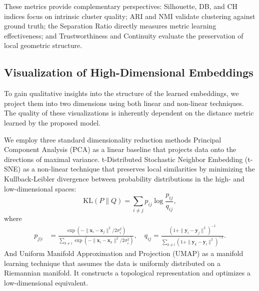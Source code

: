 \documentclass[a4paper,12pt,reqno]{amsart}
\theoremstyle{definition}
\theoremstyle{remark}
\begin{document}
These metrics provide complementary perspectives: Silhouette, DB, and CH indices focus on intrinsic cluster quality; ARI and NMI validate clustering against ground truth; the Separation Ratio directly measures metric learning effectiveness; and Trustworthiness and Continuity evaluate the preservation of local geometric structure.

\subsection{Visualization of High-Dimensional Embeddings}
To gain qualitative insights into the structure of the learned embeddings, we project them into two dimensions using both linear and non-linear techniques. The quality of these visualizations is inherently dependent on the distance metric learned by the proposed model.

We employ three standard dimensionality reduction methods Principal Component Analysis (PCA) \cite{doi:10.1080/14786440109462720} as a linear baseline that projects data onto the directions of maximal variance. t-Distributed Stochastic Neighbor Embedding (t-SNE) \cite{maaten2008visualizing} as a non-linear technique that preserves local similarities by minimizing the Kullback-Leibler divergence \cite{kullback1951information} between probability distributions in the high- and low-dimensional spaces:
\begin{equation}
 \text{KL}(P \| Q) = \sum_{i \neq j} p_{ij} \log \frac{p_{ij}}{q_{ij}},    
\end{equation}
where
        \begin{align}
         p_{j|i} &= \frac{\exp(-\|\mathbf{x}_i - \mathbf{x}_j\|^2 / 2\sigma_i^2)}{\sum_{k \neq i} \exp(-\|\mathbf{x}_i - \mathbf{x}_k\|^2 / 2\sigma_i^2)}, \quad
            q_{ij} = \frac{(1 + \|\mathbf{y}_i - \mathbf{y}_j\|^2)^{-1}}{\sum_{k \neq l} (1 + \|\mathbf{y}_k - \mathbf{y}_l\|^2)^{-1}}.
        \end{align}
And Uniform Manifold Approximation and Projection (UMAP) \cite{mcinnes2018umap} as a manifold learning technique that assumes the data is uniformly distributed on a Riemannian manifold. It constructs a topological representation and optimizes a low-dimensional equivalent.
\end{document}
